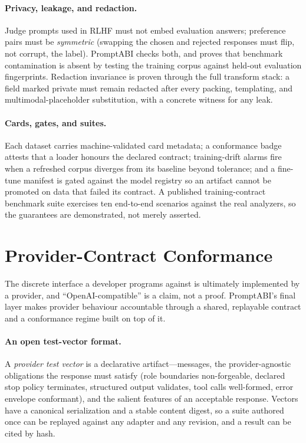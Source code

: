 \documentclass[10pt]{article}
\begin{document}
\paragraph{Privacy, leakage, and redaction.} Judge prompts used in RLHF must not
embed evaluation answers; preference pairs must be \emph{symmetric} (swapping the
chosen and rejected responses must flip, not corrupt, the label). PromptABI
checks both, and proves that benchmark contamination is absent by testing the
training corpus against held-out evaluation fingerprints. Redaction invariance is
proven through the full transform stack: a field marked private must remain
redacted after every packing, templating, and multimodal-placeholder
substitution, with a concrete witness for any leak.

\paragraph{Cards, gates, and suites.} Each dataset carries machine-validated card
metadata; a conformance badge attests that a loader honours the declared contract;
training-drift alarms fire when a refreshed corpus diverges from its baseline
beyond tolerance; and a fine-tune manifest is gated against the model registry so
an artifact cannot be promoted on data that failed its contract. A published
training-contract benchmark suite exercises ten end-to-end scenarios against the
real analyzers, so the guarantees are demonstrated, not merely asserted.

\newpage
\section{Provider-Contract Conformance}
\label{sec:provider-conformance}

The discrete interface a developer programs against is ultimately implemented by
a provider, and ``OpenAI-compatible'' is a claim, not a proof. PromptABI's final
layer makes provider behaviour accountable through a shared, replayable contract
and a conformance regime built on top of it.

\paragraph{An open test-vector format.} A \emph{provider test vector} is a
declarative artifact---messages, the provider-agnostic obligations the response
must satisfy (role boundaries non-forgeable, declared stop policy terminates,
structured output validates, tool calls well-formed, error envelope conformant),
and the salient features of an acceptable response. Vectors have a canonical
serialization and a stable content digest, so a suite authored once can be
replayed against any adapter and any revision, and a result can be cited by hash.
\end{document}
